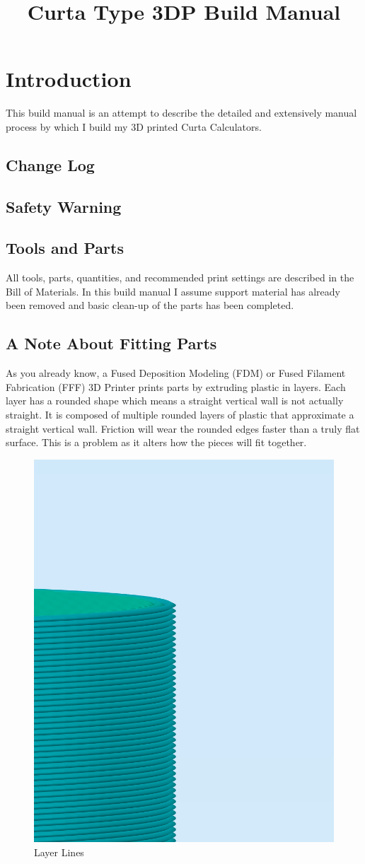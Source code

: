 \documentclass[openany]{book}
\title{Curta Type 3DP Build Manual}
\date{}
\begin{document}
\maketitle

\tableofcontents

\chapter{Introduction}
This build manual is an attempt to describe the detailed and extensively manual process by which
I build my 3D printed Curta Calculators.


\section{Change Log}

\section{Safety Warning}


\section{Tools and Parts}
All tools, parts, quantities, and recommended print settings are described in the Bill of Materials. In this build manual I assume support material has already been removed and basic clean-up of the parts has been completed.



\section{A Note About Fitting Parts}
As you already know, a Fused Deposition Modeling (FDM) or Fused Filament Fabrication (FFF) 3D Printer prints parts by extruding plastic in layers. Each layer has a rounded shape which means a straight vertical wall is not actually straight. It is composed of multiple rounded layers of plastic that approximate a straight vertical wall. Friction will wear the rounded edges faster than a truly flat surface. This is a problem as it alters how the pieces will fit together.

\begin{figure}[!ht]
	\centering
	\includegraphics[width=.25\textwidth]{images/image12.png}
	\caption{Layer Lines}
	\label{fig:layerlines}
\end{figure}
\end{document}
